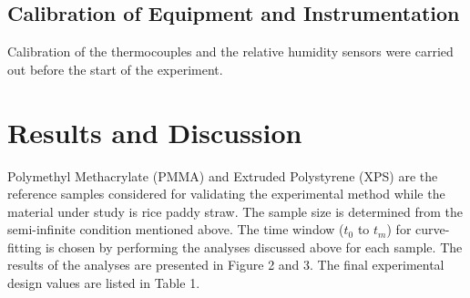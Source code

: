 \documentclass[12pt]{report}
\begin{document}
\subsection*{Calibration of Equipment and Instrumentation}
Calibration of the thermocouples and the relative humidity sensors were
carried out before the start of the experiment.




\section*{Results and Discussion}

Polymethyl Methacrylate (PMMA) and Extruded Polystyrene (XPS) are the
reference samples considered for validating the experimental method
while the material under study is rice paddy straw.  The
sample size is determined from the semi-infinite condition mentioned
above. The time window (\(t_0\) to \(t_m\)) for curve-fitting is chosen
by performing the analyses discussed above for each sample. The results
of the analyses are presented in Figure 2 and 3. The final experimental
design values are listed in Table 1.
\end{document}
